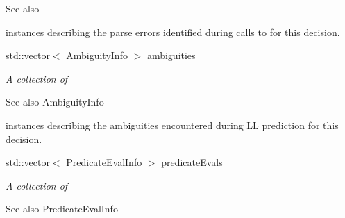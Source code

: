 \begin{DoxyCompactItemize}
\begin{DoxyCompactList}
\begin{DoxySeeAlso}{See also}
\end{DoxySeeAlso}
instances describing the parse errors identified during calls to  for this decision. \end{DoxyCompactList}\item 
std\+::vector$<$ Ambiguity\+Info $>$ \hyperlink{classantlr4_1_1atn_1_1DecisionInfo_a63842cdb1628b1e6ff45ae2c8d4a68d8}{ambiguities}
\begin{DoxyCompactList}\small\item\em A collection of \begin{DoxySeeAlso}{See also}
Ambiguity\+Info


\end{DoxySeeAlso}
instances describing the ambiguities encountered during LL prediction for this decision. \end{DoxyCompactList}\item 
std\+::vector$<$ Predicate\+Eval\+Info $>$ \hyperlink{classantlr4_1_1atn_1_1DecisionInfo_aeedf6b569f2d3cd3902d0218a50526a1}{predicate\+Evals}
\begin{DoxyCompactList}\small\item\em A collection of \begin{DoxySeeAlso}{See also}
Predicate\+Eval\+Info



\end{DoxySeeAlso}
\end{DoxyCompactList}
\end{DoxyCompactItemize}
